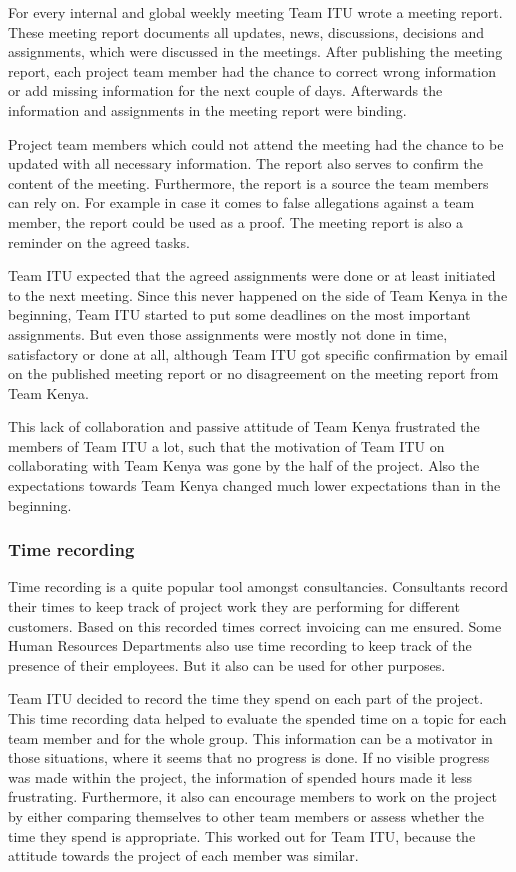 For every internal and global weekly meeting Team ITU wrote a meeting report. These meeting report documents all updates, news, discussions, decisions and assignments, which were discussed in the meetings. After publishing the meeting report, each project team member had the chance to correct wrong information or add missing information for the next couple of days. Afterwards the information and assignments in the meeting report were binding.

Project team members which could not attend the meeting had the chance to be updated with all necessary information. The report also serves to confirm the content of the meeting. Furthermore, the report is a source the team members can rely on. For example in case it comes to false allegations against a team member, the report could be used as a proof. The meeting report is also a reminder on the agreed tasks.

Team ITU expected that the agreed assignments were done or at least initiated to the next meeting. Since this never happened on the side of Team Kenya in the beginning, Team ITU started to put some deadlines on the most important assignments. But even those assignments were mostly not done in time, satisfactory or done at all, although Team ITU got specific confirmation by email on the published meeting report or no disagreement on the meeting report from Team Kenya.

This lack of collaboration and passive attitude of Team Kenya frustrated the members of Team ITU a lot, such that the motivation of Team ITU on collaborating with Team Kenya was gone by the half of the project. Also the expectations towards Team Kenya changed much lower expectations than in the beginning.

\subsubsection {Time recording}
Time recording is a quite popular tool amongst consultancies. Consultants record their times to keep track of project work they are performing for different customers. Based on this recorded times correct invoicing can me ensured. Some Human Resources Departments also use time recording to keep track of the presence of their employees. But it also can be used for other purposes.

Team ITU decided to record the time they spend on each part of the project. This time recording data helped to evaluate the spended time on a topic for each team member and for the whole group. This information can be a motivator in those situations, where it seems that no progress is done. If no visible progress was made within the project, the information of spended hours made it less frustrating. Furthermore, it also can encourage members to work on the project by either comparing themselves to other team members or assess whether the time they spend is appropriate. This worked out for Team ITU, because the attitude towards the project of each member was similar.

